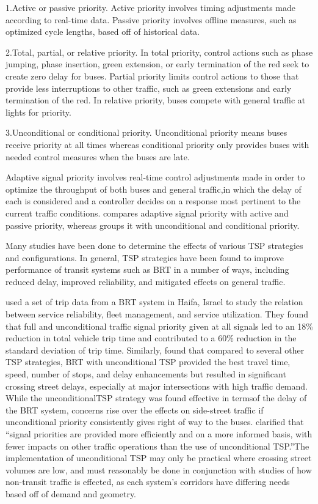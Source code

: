 \documentclass[]{elsarticle} %
\begin{document}
1.Active or passive priority. Active priority involves timing adjustments made
according to real-time data. Passive priority involves offline measures, such
as optimized cycle lengths, based off of historical data.

2.Total, partial, or relative priority. In total priority, control actions such
as phase jumping, phase insertion, green extension, or early termination of
the red seek to create zero delay for buses. Partial priority limits control
actions to those that provide less interruptions to other traffic, such as
green extensions and early termination of the red. In relative priority, buses
compete with general traffic at lights for priority.

3.Unconditional or conditional priority. Unconditional priority means buses
receive priority at all times whereas conditional priority only provides buses
with needed control measures when the buses are late.

Adaptive signal priority involves real-time control adjustments made in order to
optimize the throughput of both buses and general traffic,in which the delay of
each is considered and a controller decides on a response most pertinent to the
current traffic conditions. \citet{NI20201} compares adaptive signal priority with
active and passive priority, whereas \citet{ALDEEK2017227} groups it with unconditional
and conditional priority.

Many studies have been done to determine the effects of various TSP strategies
and configurations. In general, TSP strategies have been found to improve
performance of transit systems such as BRT in a number of ways, including
reduced delay, improved reliability, and mitigated effects on general traffic.

\citet{ISHAQ2020946} used a set of trip data from a BRT system in Haifa, Israel to
study the relation between service reliability, fleet management, and service
utilization. They found that full and unconditional traffic signal priority
given at all signals led to an 18\% reduction in total vehicle trip time and
contributed to a 60\% reduction in the standard deviation of trip time.
Similarly, \citet{ALDEEK2017227} found that compared to several other TSP strategies,
BRT with unconditional TSP provided the best travel time, speed, number of
stops, and delay enhancements but resulted in significant crossing street
delays, especially at major intersections with high traffic demand. While the
unconditionalTSP strategy was found effective in termsof the delay of the BRT
system, concerns rise over the effects on side-street traffic if unconditional
priority consistently gives right of way to the buses. \citet{Liu2018} clarified that
``signal priorities are provided more efficiently and on a more informed basis,
with fewer impacts on other traffic operations than the use of unconditional
TSP.''The implementation of unconditional TSP may only be practical where
crossing street volumes are low, and must reasonably be done in conjunction with
studies of how non-transit traffic is effected, as each system's corridors have
differing needs based off of demand and geometry.
\end{document}
